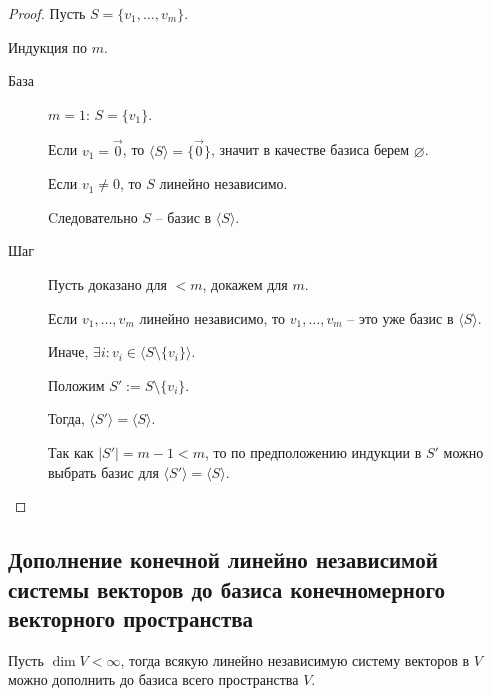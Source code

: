\begin{proof}
    Пусть $S = \{v_1, \dots, v_m\}$.

    Индукция по $m$.

    \begin{description}
    \item[База]
        $m = 1$: $S = \{v_1\}$.

        Если $v_1 = \overrightarrow{0}$, то $\langle S \rangle = \{\overrightarrow{0}\}$, значит в качестве базиса берем $\varnothing$.

        Если $v_1 \neq 0$, то $S$ линейно независимо.

        Cледовательно $S$ -- базис в $\langle S \rangle$.

    \item[Шаг]
        Пусть доказано для $< m$, докажем для $m$.

        Если $v_1, \dots, v_m$ линейно независимо, то $v_1, \dots, v_m$ -- это уже базис в $\langle S \rangle$.

        Иначе, $\exists i : v_i \in \langle S \setminus \{v_i\} \rangle$.

        Положим $S' := S \setminus \{v_i\}$.

        Тогда, $\langle S' \rangle = \langle S \rangle$.

        Так как $|S'| = m - 1 < m$, то по предположению индукции в $S'$ можно выбрать базис для $\langle S' \rangle = \langle S \rangle$.
        \qedhere
    \end{description}
\end{proof}

\subsection{Дополнение конечной линейно независимой системы векторов до базиса конечномерного векторного пространства}

\begin{proposal}
    Пусть $\dim V < \infty$, тогда всякую линейно независимую систему векторов в $V$ можно дополнить до базиса всего пространства $V$.
\end{proposal}

